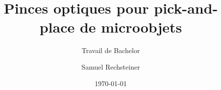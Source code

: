 \author{Samuel Rechsteiner}


\title{Pinces optiques pour pick-and-place de microobjets}

\subtitle{Travail de Bachelor}


\date{\today}


